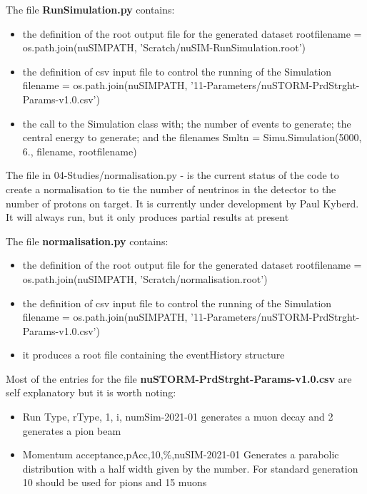 \noindent The file {\bf RunSimulation.py} contains:
\begin{itemize}
\item the definition of the root output file for the generated dataset \newline
rootfilename = os.path.join(nuSIMPATH, 'Scratch/nuSIM-RunSimulation.root')
\item the definition of csv  input file to control the running of the Simulation \newline
filename  = os.path.join(nuSIMPATH, '11-Parameters/nuSTORM-PrdStrght-Params-v1.0.csv')
\item the call to the Simulation class with; the number of events to generate; the central energy to generate; and the filenames\newline
Smltn = Simu.Simulation(5000, 6., filename, rootfilename)
\end{itemize}
\hfill\newline

The file in 04-Studies/normalisation.py - is the current status of the code to create a normalisation 
to tie the number of neutrinos in the detector to the number of protons on target.
It is currently under development by Paul Kyberd. It will always run, but it only produces
partial results at present\newline

\noindent The file {\bf normalisation.py} contains:
\begin{itemize}
\item the definition of the root output file for the generated dataset \newline
rootfilename = os.path.join(nuSIMPATH, 'Scratch/normalisation.root')
\item the definition of csv  input file to control the running of the Simulation \newline
filename  = os.path.join(nuSIMPATH, '11-Parameters/nuSTORM-PrdStrght-Params-v1.0.csv')
\item it produces a root file containing the eventHistory structure
\end{itemize}

\hfil\newline
\noindent Most of the entries for the file {\bf nuSTORM-PrdStrght-Params-v1.0.csv} are self explanatory but it is worth noting:
\begin{itemize}
\item Run Type, rType, 1, i, numSim-2021-01 generates a muon decay and 2 generates a pion beam\newline
\item Momentum acceptance,pAcc,10,\%,nuSIM-2021-01\newline
Generates a parabolic distribution with a half width given by the number. For standard generation 10 should be used for pions and 15 muons
\end{itemize}

